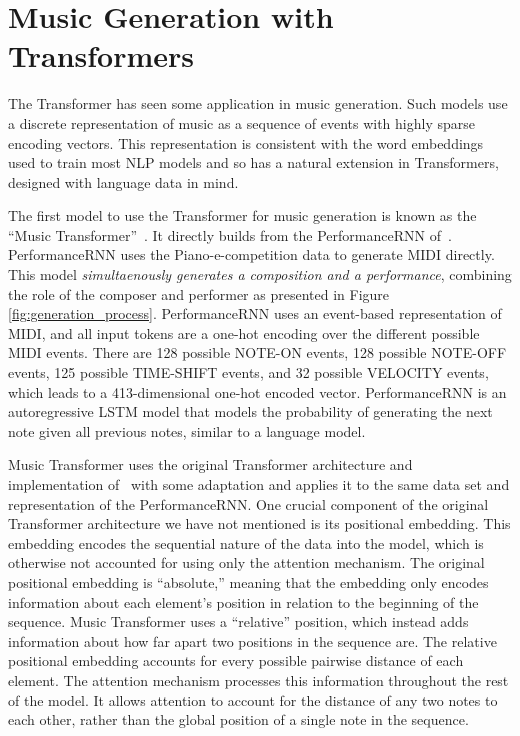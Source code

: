 \section{Music Generation with Transformers}
The Transformer has seen some application in music generation. Such models use a discrete representation of music as a sequence of events with highly sparse encoding vectors. This representation is consistent with the word embeddings used to train most NLP models and so has a natural extension in Transformers, designed with language data in mind. 

The first model to use the Transformer for music generation is known as the ``Music Transformer''~\cite{huang2018music}. It directly builds from the PerformanceRNN of~\citet{oore2020time}. PerformanceRNN uses the Piano-e-competition data to generate MIDI directly. This model \emph{simultaenously generates a composition and a performance}, combining the role of the composer and performer as presented in Figure \ref{fig:generation_process}. PerformanceRNN uses an event-based representation of MIDI, and all input tokens are a one-hot encoding over the different possible MIDI events. There are 128 possible NOTE-ON events, 128 possible NOTE-OFF events, 125 possible TIME-SHIFT events, and 32 possible VELOCITY events, which leads to a 413-dimensional one-hot encoded vector. PerformanceRNN is an autoregressive LSTM model that models the probability of generating the next note given all previous notes, similar to a language model. 

Music Transformer uses the original Transformer architecture and implementation of~\citet{vaswani2017attention} with some adaptation and applies it to the same data set and representation of the PerformanceRNN. One crucial component of the original Transformer architecture we have not mentioned is its positional embedding. This embedding encodes the sequential nature of the data into the model, which is otherwise not accounted for using only the attention mechanism. The original positional embedding is ``absolute,'' meaning that the embedding only encodes information about each element's position in relation to the beginning of the sequence. Music Transformer uses a ``relative'' position, which instead adds information about how far apart two positions in the sequence are. The relative positional embedding accounts for every possible pairwise distance of each element. The attention mechanism processes this information throughout the rest of the model. It allows attention to account for the distance of any two notes to each other, rather than the global position of a single note in the sequence. 

